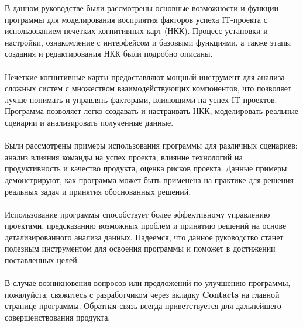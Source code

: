 \documentclass{article}
\begin{document}
    В данном руководстве были рассмотрены основные возможности и функции программы для моделирования восприятия факторов успеха IT-проекта с использованием нечетких когнитивных карт (НКК). Процесс установки и настройки, ознакомление с интерфейсом и базовыми функциями, а также этапы создания и редактирования НКК были подробно описаны.\\
    ~\\
    Нечеткие когнитивные карты предоставляют мощный инструмент для анализа сложных систем с множеством взаимодействующих компонентов, что позволяет лучше понимать и управлять факторами, влияющими на успех IT-проектов. Программа позволяет легко создавать и настраивать НКК, моделировать реальные сценарии и анализировать полученные данные.\\
    ~\\
    Были рассмотрены примеры использования программы для различных сценариев: анализ влияния команды на успех проекта, влияние технологий на продуктивность и качество продукта, оценка рисков проекта. Данные примеры демонстрируют, как программа может быть применена на практике для решения реальных задач и принятия обоснованных решений.\\
    ~\\
    Использование программы способствует более эффективному управлению проектами, предсказанию возможных проблем и принятию решений на основе детализированного анализа данных. Надеемся, что данное руководство станет полезным инструментом для освоения программы и поможет в достижении поставленных целей.\\
    ~\\
    В случае возникновения вопросов или предложений по улучшению программы, пожалуйста, свяжитесь с разработчиком через вкладку \textbf{Contacts} на главной странице программы. Обратная связь всегда приветствуется для дальнейшего совершенствования продукта.\\
\end{document}
